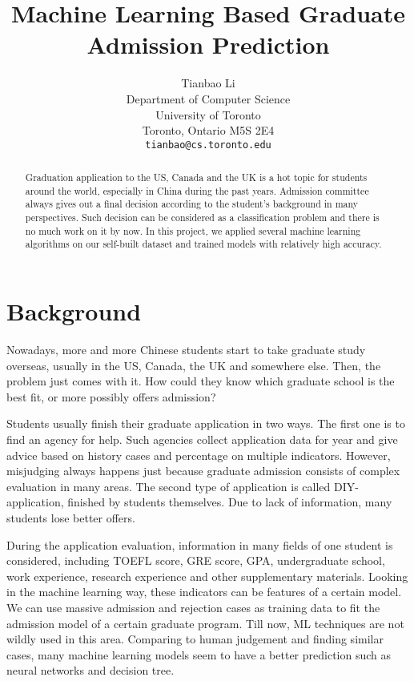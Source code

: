 \documentclass{article}
\title{Machine Learning Based Graduate Admission Prediction}
\author{
  Tianbao Li\\
  Department of Computer Science\\
  University of Toronto\\
  Toronto, Ontario M5S 2E4\\
  \texttt{tianbao@cs.toronto.edu} \\
}
\begin{document}

\maketitle

\begin{abstract}
Graduation application to the US, Canada and the UK is a hot topic for students around the world, especially in China during the past years. Admission committee always gives out a final decision according to the student's background in many perspectives. Such decision can be considered as a classification problem and there is no much work on it by now. In this project, we applied several machine learning algorithms on our self-built dataset and trained models with relatively high accuracy.
\end{abstract}

\section{Background}

Nowadays, more and more Chinese students start to take graduate study overseas, usually in the US, Canada, the UK and somewhere else. Then, the problem just comes with it. How could they know which graduate school is the best fit, or more possibly offers admission?

Students usually finish their graduate application in two ways. The first one is to find an agency for help. Such agencies collect application data for year and give advice based on history cases and percentage on multiple indicators. However, misjudging always happens just because graduate admission consists of complex evaluation in many areas. The second type of application is called DIY-application, finished by students themselves. Due to lack of information, many students lose better offers.

During the application evaluation, information in many fields of one student is considered, including TOEFL score, GRE score, GPA, undergraduate school, work experience, research experience and other supplementary materials. Looking in the machine learning way, these indicators can be features of a certain model. We can use massive admission and rejection cases as training data to fit the admission model of a certain graduate program. Till now, ML techniques are not wildly used in this area. Comparing to human judgement and finding similar cases, many machine learning models seem to have a better prediction such as neural networks and decision tree.
\end{document}
